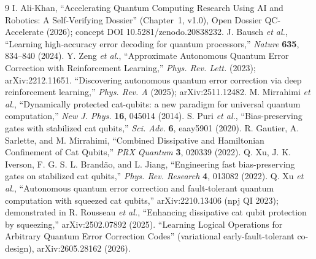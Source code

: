 \documentclass[11pt]{article}
\begin{document}
\begin{thebibliography}{9}
 I. Ali-Khan, ``Accelerating Quantum Computing Research Using AI and Robotics:
A Self-Verifying Dossier'' (Chapter~1, v1.0), Open Dossier QC-Accelerate (2026); concept DOI
10.5281/zenodo.20838232.
 J. Bausch \emph{et al.}, ``Learning high-accuracy error decoding for
quantum processors,'' \emph{Nature} \textbf{635}, 834--840 (2024).
 Y. Zeng \emph{et al.}, ``Approximate Autonomous Quantum Error Correction with
Reinforcement Learning,'' \emph{Phys. Rev. Lett.} (2023); arXiv:2212.11651.
 ``Discovering autonomous quantum error correction via deep reinforcement
learning,'' \emph{Phys. Rev. A} (2025); arXiv:2511.12482.
 M. Mirrahimi \emph{et al.}, ``Dynamically protected cat-qubits: a new
paradigm for universal quantum computation,'' \emph{New J. Phys.} \textbf{16}, 045014 (2014).
 S. Puri \emph{et al.}, ``Bias-preserving gates with stabilized cat qubits,''
\emph{Sci. Adv.} \textbf{6}, eaay5901 (2020).
 R. Gautier, A. Sarlette, and M. Mirrahimi, ``Combined Dissipative and
Hamiltonian Confinement of Cat Qubits,'' \emph{PRX Quantum} \textbf{3}, 020339 (2022).
 Q. Xu, J. K. Iverson, F. G. S. L. Brand\~ao, and L. Jiang, ``Engineering fast
bias-preserving gates on stabilized cat qubits,'' \emph{Phys. Rev. Research} \textbf{4},
013082 (2022).
 Q. Xu \emph{et al.}, ``Autonomous quantum error correction and
fault-tolerant quantum computation with squeezed cat qubits,'' arXiv:2210.13406 (npj QI 2023);
demonstrated in R. Rousseau \emph{et al.}, ``Enhancing dissipative cat qubit protection by
squeezing,'' arXiv:2502.07892 (2025).
 ``Learning Logical Operations for Arbitrary Quantum Error Correction Codes''
(variational early-fault-tolerant co-design), arXiv:2605.28162 (2026).
\end{thebibliography}
\end{document}
